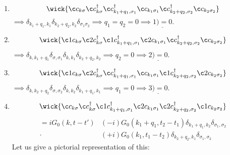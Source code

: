 \begin{enumerate}[1)]
	\item 
	\begin{equation} 
	\wick{\c c_{k\sigma} \c c_{k\sigma}^\dagger \c c_{k_1+q_1, \sigma_1}^\dagger \c c_{k_1\sigma_1} \c c_{k_2+q_2, \sigma_2}^\dagger \c c_{k_2\sigma_2}}
	\end{equation}
	$\implies \delta_{k_1 + q_1, k_1}\delta_{k_2 + q_2, k_2}\delta_{\sigma_1\sigma_2} \implies q_1=q_2 = 0 \implies \underline{1) = 0}.$
	\item
	\begin{equation} 
	\wick{\c1 c_{k\sigma} \c2 c_{k\sigma}^\dagger \c1 c_{k_1+q_1, \sigma_1}^\dagger \c2 c_{k_1\sigma_1} \c c_{k_2+q_2, \sigma_2}^\dagger \c c_{k_2\sigma_2}}
	\end{equation}
	$\implies \delta_{k, k_1+q_1}\delta_{\sigma, \sigma_1}\delta_{k, k_1}\delta_{k_2 + q_2, k_2} \implies q_2 = 0 \implies \underline{2) = 0}$.
	\item 
	\begin{equation} 
	\wick{\c1 c_{k\sigma} \c2 c_{k\sigma}^\dagger \c c_{k_1+q_1, \sigma_1}^\dagger \c c_{k_1\sigma_1} \c1 c_{k_2+q_2, \sigma_2}^\dagger \c2 c_{k_2\sigma_2}}
	\end{equation}
	$\implies \delta_{k, k_2 +q_2}\delta_{\sigma, \sigma_2}\delta_{k, k_2}\delta_{k_1+q_1, k_1} \implies q_1 = 0 \implies \underline{3) = 0}$.
	\item
	\begin{equation} 
	\wick{\c c_{k\sigma} \c c_{k\sigma}^\dagger \c1 c_{k_1+q_1, \sigma_1}^\dagger \c2 c_{k_1\sigma_1} \c2 c_{k_2+q_2, \sigma_2}^\dagger \c1 c_{k_2\sigma_2}}
	\end{equation}
	\begin{align*} 
	=iG_0(k, t-t')&(-i)G_0(k_1+q_1, t_2-t_1)\delta_{k_1+q_1, k_2}\delta_{\sigma_1, \sigma_2} \\
	\cdot&(+i)G_0(k_1, t_1-t_2)\delta_{k_2+q_2, k_1}\delta_{\sigma_1, \sigma_2}
	\end{align*}
	Let us give a pictorial representation of this:
	\begin{center}
\end{center}
\end{enumerate}
